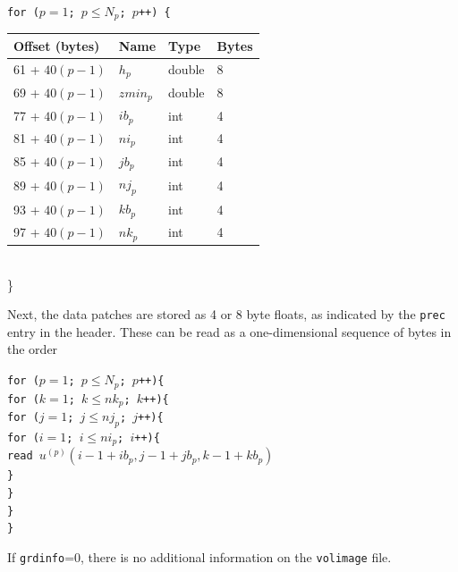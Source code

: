 \documentclass[11pt]{report}
\begin{document}
{{\samepage
\begin{flushleft}
	{\tt for ($p=1$; $p\leq N_p$; $p$++) \{}\nopagebreak \\
	\hspace{5mm}
	\begin{tabular}{llll}\hline
		Offset (bytes)   & Name       & Type   & Bytes \\ \hline
		61 + $40(p - 1)$ & $h_{p}$    & double & 8     \\ \hline
		69 + $40(p - 1)$ & $zmin_{p}$ & double & 8     \\ \hline
		77 + $40(p - 1)$ & $ib_{p}$   & int    & 4     \\ \hline
		81 + $40(p - 1)$ & $ni_{p}$   & int    & 4     \\ \hline
		85 + $40(p - 1)$ & $jb_{p}$   & int    & 4     \\ \hline
		89 + $40(p - 1)$ & $nj_{p}$   & int    & 4     \\ \hline
		93 + $40(p - 1)$ & $kb_{p}$   & int    & 4     \\ \hline
		97 + $40(p - 1)$ & $nk_{p}$   & int    & 4     \\ \hline
	\end{tabular}\\
	\}
\end{flushleft}
}
Next, the data patches are stored as 4 or 8 byte floats, as indicated by the \verb+prec+ entry
in the header. These can be read as a one-dimensional sequence of bytes in the order
\begin{flushleft}
	{\tt for ($p=1$; $p\leq N_p$; $p$++)\{\\
		\hspace{5mm}for ($k=1$; $k\leq nk_p$; $k$++)\{\\
		\hspace{10mm}for ($j=1$; $j\leq nj_p$; $j$++)\{\\
		\hspace{15mm}for ($i=1$; $i\leq ni_p$; $i$++)\{\\
		\hspace{20mm}read $u^{(p)}(i-1+ib_p, j-1+jb_p,k-1+kb_p)$\\
		\hspace{15mm}\}\\
		\hspace{10mm}\}\\
		\hspace{5mm}\}\\
		\}}
\end{flushleft}
If {\tt grdinfo}=0, there is no additional information on the \verb+volimage+ file.
}
\end{document}
